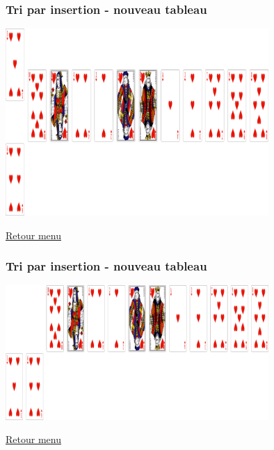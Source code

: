 \documentclass[svgnames,11pt]{beamer}
\begin{document}
\begin{frame}
    \frametitle{Tri par insertion - nouveau tableau}

    \begin{center}
        \centering
        \includegraphics[width=10cm]{ressources/insertion2-4.png}
        \label{pique}
    \end{center}
    \hyperlink{menu}{Retour menu}

\end{frame}

\begin{frame}
    \frametitle{Tri par insertion - nouveau tableau}

    \begin{center}
        \centering
        \includegraphics[width=10cm]{ressources/insertion2-5.png}
        \label{pique}
    \end{center}
    \hyperlink{menu}{Retour menu}

\end{frame}
\end{document}
